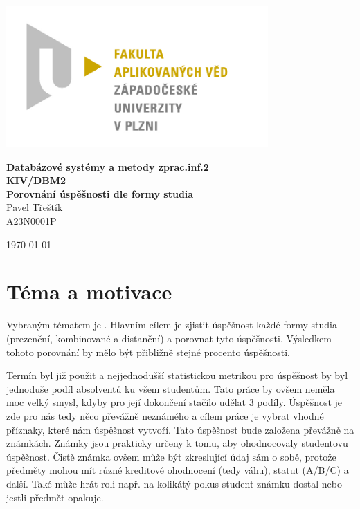 \documentclass[12pt, letterpaper]{article}
\begin{document}
\begin{titlepage}
\centerline{\includegraphics[width=10cm]{img/logo}}
\begin{center}
\vspace{30px}
{\huge
\textbf{Databázové systémy a metody zprac.inf.2}\\
\vspace{1cm}
}
{\Large
\textbf{KIV/DBM2}\\
\vspace{1cm}
}
{\large
\textbf{Porovnání úspěšnosti dle formy studia}\\
\vspace{1cm}
}
\vspace{1cm}
{\large
Pavel Třeštík\\
}
{\normalsize
A23N0001P
}
\end{center}
\vspace{\fill}
\hfill
\begin{minipage}[t]{7cm}
\flushright
\today
\end{minipage}
\end{titlepage}
\section{Téma a motivace}
Vybraným tématem je . Hlavním cílem je zjistit úspěšnost každé formy studia
(prezenční, kombinované a distanční) a porovnat tyto úspěšnosti. Výsledkem tohoto porovnání by mělo být přibližně
stejné procento úspěšnosti.

Termín  byl již použit a nejjednodušší statistickou metrikou pro úspěšnost by byl jednoduše podíl
absolventů ku všem studentům. Tato práce by ovšem neměla moc velký smysl, kdyby pro její dokončení stačilo 
udělat 3 podíly. Úspěšnost je zde pro nás tedy něco převážně neznámého a cílem práce je vybrat vhodné příznaky, které
nám úspěšnost vytvoří. Tato úspěšnost bude založena převážně na známkách. Známky jsou prakticky určeny k tomu, aby
ohodnocovaly studentovu úspěšnost. Čistě známka ovšem může být zkreslující údaj sám o sobě, protože předměty mohou
mít různé kreditové ohodnocení (tedy váhu), statut (A/B/C) a další. Také může hrát roli např. na kolikátý pokus
student známku dostal nebo jestli předmět opakuje.
\end{document}
